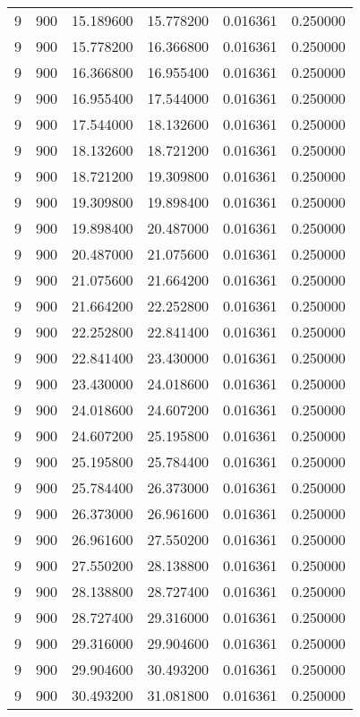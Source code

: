 \begin{longtable}{rrrrrr}
9 & 900 & 15.189600 & 15.778200 & 0.016361 & 0.250000 \\
9 & 900 & 15.778200 & 16.366800 & 0.016361 & 0.250000 \\
9 & 900 & 16.366800 & 16.955400 & 0.016361 & 0.250000 \\
9 & 900 & 16.955400 & 17.544000 & 0.016361 & 0.250000 \\
9 & 900 & 17.544000 & 18.132600 & 0.016361 & 0.250000 \\
9 & 900 & 18.132600 & 18.721200 & 0.016361 & 0.250000 \\
9 & 900 & 18.721200 & 19.309800 & 0.016361 & 0.250000 \\
9 & 900 & 19.309800 & 19.898400 & 0.016361 & 0.250000 \\
9 & 900 & 19.898400 & 20.487000 & 0.016361 & 0.250000 \\
9 & 900 & 20.487000 & 21.075600 & 0.016361 & 0.250000 \\
9 & 900 & 21.075600 & 21.664200 & 0.016361 & 0.250000 \\
9 & 900 & 21.664200 & 22.252800 & 0.016361 & 0.250000 \\
9 & 900 & 22.252800 & 22.841400 & 0.016361 & 0.250000 \\
9 & 900 & 22.841400 & 23.430000 & 0.016361 & 0.250000 \\
9 & 900 & 23.430000 & 24.018600 & 0.016361 & 0.250000 \\
9 & 900 & 24.018600 & 24.607200 & 0.016361 & 0.250000 \\
9 & 900 & 24.607200 & 25.195800 & 0.016361 & 0.250000 \\
9 & 900 & 25.195800 & 25.784400 & 0.016361 & 0.250000 \\
9 & 900 & 25.784400 & 26.373000 & 0.016361 & 0.250000 \\
9 & 900 & 26.373000 & 26.961600 & 0.016361 & 0.250000 \\
9 & 900 & 26.961600 & 27.550200 & 0.016361 & 0.250000 \\
9 & 900 & 27.550200 & 28.138800 & 0.016361 & 0.250000 \\
9 & 900 & 28.138800 & 28.727400 & 0.016361 & 0.250000 \\
9 & 900 & 28.727400 & 29.316000 & 0.016361 & 0.250000 \\
9 & 900 & 29.316000 & 29.904600 & 0.016361 & 0.250000 \\
9 & 900 & 29.904600 & 30.493200 & 0.016361 & 0.250000 \\
9 & 900 & 30.493200 & 31.081800 & 0.016361 & 0.250000 \\

\end{longtable}
